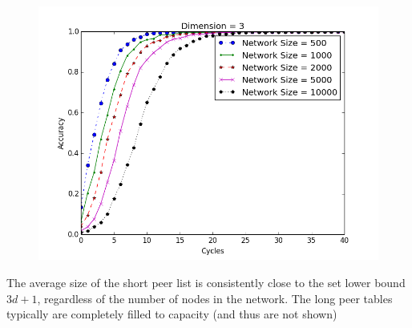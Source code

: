 \documentclass{IEEEtran}
\begin{document}
\begin{figure}
	\centering
	\includegraphics[width=\linewidth]{conv_d3}
	\caption{}
	\label{conv3}
\end{figure}



The average size of the short peer list is consistently close to the set lower bound $3d+1$, regardless of the number of nodes in the network.   
The long peer tables typically are completely filled to capacity (and thus are not shown)
\end{document}
